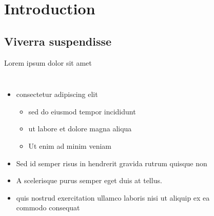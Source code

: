 \section{Introduction}

\subsection{Viverra suspendisse}

\begin{frame}{Lorem ipsum dolor sit amet}
\vspace{-12pt}
\begin{columns}
\begin{itemize}
    \item consectetur adipiscing elit
    \begin{itemize}
        \item sed do eiusmod tempor incididunt
        \item ut labore et dolore magna aliqua
        \item Ut enim ad minim veniam
    \end{itemize}
    \bigskip 
    \item Sed id semper risus in hendrerit gravida rutrum quisque non\cite{knox_ratio_2012}
    \bigskip 
    \item A scelerisque purus semper eget duis at tellus. 
    \item quis nostrud exercitation ullamco laboris nisi ut aliquip ex ea commodo consequat\cite{xie_youwont_2023,weiherer_zero_2023}
\end{itemize}
\begin{figure}
    \centering

\end{figure}
\end{columns}
\end{frame}
